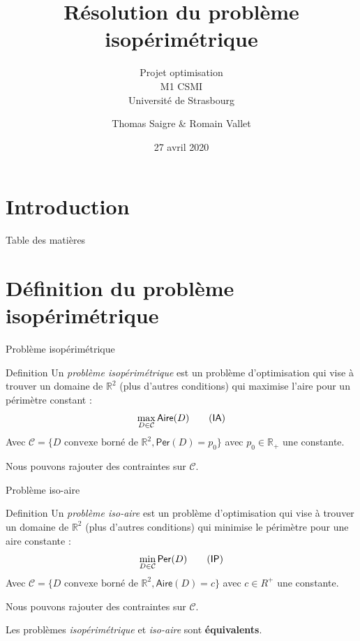 \documentclass[11pt,envcountsect,aspectratio=169]{beamer} %
\author[Thomas S. \& Romain V.]{Thomas Saigre \& Romain Vallet}
\title{Résolution du problème isopérimétrique}
\subtitle{Projet optimisation \\ M1 CSMI \\ Université de Strasbourg}
\date{27 avril 2020}
\newcommand{\frametitre}{\begin{frame}
    \begin{center}
    {\Large\bf \secname}
    \end{center}
    \end{frame}
}
\newcommand{\R}{\mathbb{R}}
\newcommand{\C}{\mathcal{C}}
\newcommand{\A}{\mathsf{Aire}}
\newcommand{\p}{\mathsf{Per}}
\newcommand{\IA}{\textsf{IA}}
\newcommand{\IP}{\textsf{IP}}
\begin{document}
\begin{frame}[plain]
\titlepage
\end{frame}


\section[Introduction]{Introduction}




\begin{frame}{Table des matières}
\tableofcontents[hideallsubsections]
\end{frame}




\section{Définition du problème isopérimétrique}

\begin{frame}{Problème isopérimétrique}

\begin{beamerboxesrounded}[upper=titreB,lower=texteB,shadow=true]{Definition}
        Un \emph{problème isopérimétrique} est un problème d'optimisation qui vise à trouver un domaine de $\R^2$ (plus d'autres conditions) qui maximise l'aire pour un périmètre constant :
        \[\max_{D \in \C} \A(D) \label{ia}\tag{\IA}\]
        Avec $\mathcal{C} = \{ D \text{ convexe borné de } \R^2, \p(D) = p_0 \}$ avec $p_0 \in \R_+$ une constante.
\end{beamerboxesrounded}

Nous pouvons rajouter des contraintes sur $\C$.

\end{frame}

\begin{frame}{Problème iso-aire}

\begin{beamerboxesrounded}[upper=titreB,lower=texteB,shadow=true]{Definition}
        Un \emph{problème iso-aire} est un problème d'optimisation qui vise à trouver un domaine de $\R^2$ (plus d'autres conditions) qui minimise le périmètre pour une aire constante :
        \[\min_{D \in \C} \p(D) \label{ip}\tag{\IP}\]
        Avec $\mathcal{C} = \{ D \text{ convexe borné de } \R^2, \A(D)=c \}$ avec $c \in R^+$ une constante.
\end{beamerboxesrounded}

Nous pouvons rajouter des contraintes sur $\C$.

\vspace{\baselineskip}
Les problèmes \emph{isopérimétrique} et \emph{iso-aire} sont \textbf{équivalents}.

\end{frame}
\end{document}
